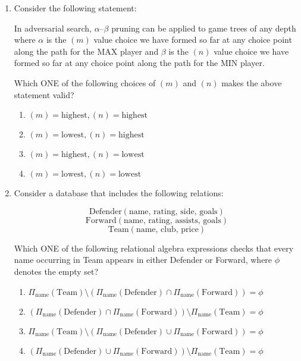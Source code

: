 \documentclass[journal,12pt,onecolumn]{IEEEtran}
\theoremstyle{remark}
\begin{document}
\begin{enumerate}
    \item Consider the following statement:

    In adversarial search, $\alpha$–$\beta$ pruning can be applied to game trees of any depth where $\alpha$ is the $(m)$ value choice we have formed so far at any choice point along the path for the MAX player and $\beta$ is the $(n)$ value choice we have formed so far at any choice point along the path for the MIN player.

    Which ONE of the following choices of $(m)$ and $(n)$ makes the above statement valid?

    \begin{enumerate}
        \item $(m) = \text{highest}, (n) = \text{highest}$
        \item $(m) = \text{lowest}, (n) = \text{highest}$
        \item $(m) = \text{highest}, (n) = \text{lowest}$
        \item $(m) = \text{lowest}, (n) = \text{lowest}$
    \end{enumerate}

    \item Consider a database that includes the following relations:

    \[
    \text{Defender}(\text{name, rating, side, goals})
    \]
    \[
    \text{Forward}(\text{name, rating, assists, goals})
    \]
    \[
    \text{Team}(\text{name, club, price})
    \]

    Which ONE of the following relational algebra expressions checks that every name occurring in Team appears in either Defender or Forward, where $\phi$ denotes the empty set?

    \begin{enumerate}
        \item $\Pi_{\text{name}}(\text{Team}) \setminus (\Pi_{\text{name}}(\text{Defender}) \cap \Pi_{\text{name}}(\text{Forward})) = \phi$
        \item $(\Pi_{\text{name}}(\text{Defender}) \cap \Pi_{\text{name}}(\text{Forward})) \setminus \Pi_{\text{name}}(\text{Team}) = \phi$
        \item $\Pi_{\text{name}}(\text{Team}) \setminus (\Pi_{\text{name}}(\text{Defender}) \cup \Pi_{\text{name}}(\text{Forward})) = \phi$
        \item $(\Pi_{\text{name}}(\text{Defender}) \cup \Pi_{\text{name}}(\text{Forward})) \setminus \Pi_{\text{name}}(\text{Team}) = \phi$
    \end{enumerate}


\end{enumerate}
\end{document}

